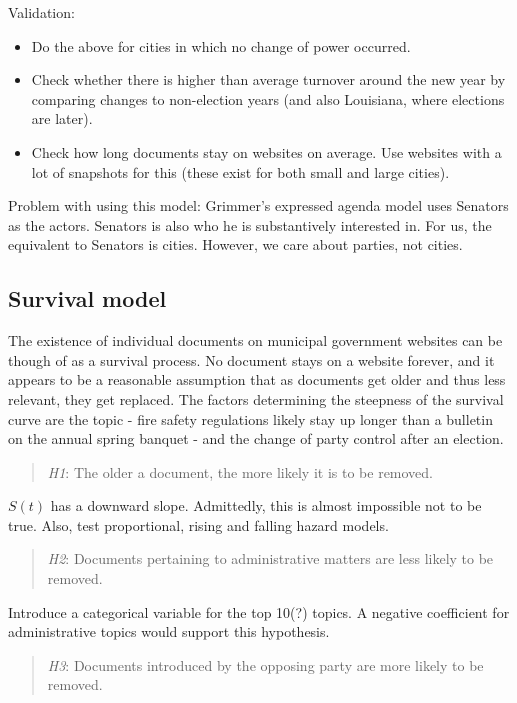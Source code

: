 \documentclass[11pt]{article}
\begin{document}
Validation:

\begin{itemize}
\item Do the above for cities in which no change of power occurred.
\item Check whether there is higher than average turnover around the new year by comparing changes to non-election years (and also Louisiana, where elections are later).
\item Check how long documents stay on websites on average. Use websites with a lot of snapshots for this (these exist for both small and large cities).
\end{itemize}

Problem with using this model: Grimmer's expressed agenda model uses Senators as the actors. Senators is also who he is substantively interested in. For us, the equivalent to Senators is cities. However, we care about parties, not cities.

\subsection{Survival model}
The existence of individual documents on municipal government websites can be though of as a survival process. No document stays on a website forever, and it appears to be a reasonable assumption that as documents get older and thus less relevant, they get replaced. The factors determining the steepness of the survival curve are the topic - fire safety regulations likely stay up longer than a bulletin on the annual spring banquet - and the change of party control after an election.

\begin{quote}
\textit{H1}: The older a document, the more likely it is to be removed.
\end{quote}

$S(t)$ has a downward slope. Admittedly, this is almost impossible not to be true. Also, test proportional, rising and falling hazard models.

\begin{quote}
\textit{H2}: Documents pertaining to administrative matters are less likely to be removed.
\end{quote}

Introduce a categorical variable for the top 10(?) topics. A negative coefficient for administrative topics would support this hypothesis.

\begin{quote}
\textit{H3}: Documents introduced by the opposing party are more likely to be removed.
\end{quote}
\end{document}
